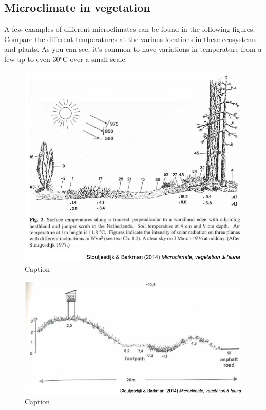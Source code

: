 \documentclass[12pt,oneside]{book}
\begin{document}
\subsection{Microclimate in
vegetation}\label{microclimate-in-vegetation}

A few examples of different microclimates can be found in the following
figures. Compare the different temperatures at the various locations in
these ecosystems and plants. As you can see, it's common to have
variations in temperature from a few up to even 30°C over a small scale.

\begin{figure}

{\centering \includegraphics[width=0.8\linewidth]{figures/Figure103} 

}

\caption{Caption}\label{fig:Micro3}
\end{figure}

\begin{figure}

{\centering \includegraphics[width=0.8\linewidth]{figures/Figure104} 

}

\caption{Caption}\label{fig:Micro4}
\end{figure}
\end{document}
